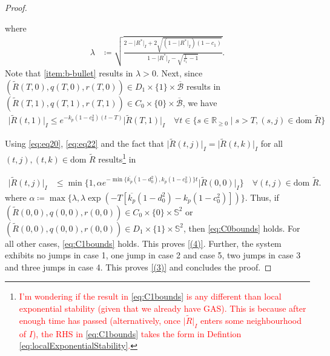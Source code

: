 \documentclass{article}
\newcommand{\dom}{\text{dom }}
\newcommand{\R}[1]{\mathbb{R}^{#1}}
\newcommand{\Rtilde}{\tilde{R}}
\newcommand{\normSOthree}[1]{{{\vert}#1 {\vert}_I}}
\newcommand{\expo}[1]{e^{#1}}
\newcommand{\Rstar}{{R^*}}
\begin{document}
\begin{proof}
\begin{flushleft}
where 
\begin{align}
    \lambda &\coloneqq \sqrt{{\frac{2 - \normSOthree{\Rstar} + 2\sqrt{(1-\normSOthree{\Rstar})(1-c_1)}}{1 - \normSOthree{\Rstar} - \sqrt{\frac{1}{c_1}-1}}}}. \label{eq:lambda}
\end{align}
Note that \ref{item:b-bullet} results in $\lambda > 0$. Next, since $(\Rtilde(T,0), q(T,0), r(T,0))\in D_1\times \{1\}\times \overline{\mathcal{B}}$ results in $(\Rtilde(T,1), q(T,1), r(T,1))\in C_0\times \{0\}\times \overline{\mathcal{B}}$, we have
\begin{align}\label{eq:eq22}
    \normSOthree{\Rtilde(t,1)} \leq \expo{-k_p(1-c_0^2)(t-T)}\normSOthree{\Rtilde(T,1)} \quad \forall t\in \{s\in\R{}_{\geq 0} \mid s > T, (s,j)\in \dom\Rtilde\}
\end{align}

Using \eqref{eq:eq20}, \eqref{eq:eq22} and the fact that $\normSOthree{\Rtilde(t,j)} = \normSOthree{\Rtilde(t,k)}$ for all $(t,j), (t,k)\in \dom{\Rtilde}$ results\footnote{\textcolor{red}{I'm wondering if the result in \eqref{eq:C1bounds} is any different than local exponential stability (given that we already have GAS). This is because after enough time has passed (alternatively, once $\normSOthree{\Rtilde}$ enters some neighbourhood of $I$), the RHS in \eqref{eq:C1bounds} takes the form in Defintion \ref{eq:localExponentialStability}.}} in 
\end{flushleft}
\begin{align}
    \normSOthree{\Rtilde(t,j)}&\leq \min\{1, \alpha\expo{-\min\{\overline{k_p}(1-d_0^2), k_p(1-c_0^2)\} t}\normSOthree{\Rtilde(0,0)}\} \quad \forall (t,j) \in \dom\Rtilde. \label{eq:C1bounds}
    \end{align}
where $\alpha \coloneqq \max\{\lambda, \lambda \exp{(-T[\overline{k_p}(1-d_0^2) - k_p(1-c_0^2)])}\}$. Thus, if ${(\Rtilde(0,0), q(0,0), r(0,0))}\in C_0\times\{0\}\times \mathbb{S}^2$ or ${(\Rtilde(0,0), q(0,0), r(0,0))}\in D_1\times\{1\}\times\mathbb{S}^2$, then \eqref{eq:C0bounds} holds. For all other cases, \eqref{eq:C1bounds} holds. This proves \eqref{(4)}.  Further, the system exhibits no jumps in case 1,  one jump in case 2 and case 5, two jumps in case 3 and three jumps in case 4. This proves \eqref{(3)} and concludes the proof.  
\end{proof}
\end{document}
